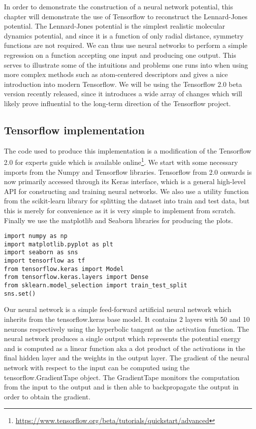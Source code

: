 In order to demonstrate the construction of a neural network
potential, this chapter will demonstrate the use of Tensorflow 
to reconstruct the Lennard-Jones potential.
The Lennard-Jones potential is the simplest
realistic molecular dynamics potential, and since it is a function
of only radial distance, symmetry functions are not required.
We can thus use neural networks to perform a simple regression
on a function accepting one input and producing one output.
This serves to illustrate some of the intuitions and problems
one runs into when using more complex methods such as 
atom-centered descriptors and gives a nice introduction into
modern Tensorflow. We will be using the Tensorflow 2.0
beta version recently released, since it introduces a wide array
of changes which will likely prove influential to the long-term
direction of the Tensorflow project.

\subsection{Tensorflow implementation}
The code used to produce this implementation is
a modification of the Tensorflow 2.0 for experts guide
which is available online\footnote{\url{
https://www.tensorflow.org/beta/tutorials/quickstart/advanced}}.
We start with some necessary imports from the Numpy and Tensorflow
libraries. Tensorflow from 2.0 onwards is now primarily accessed through
its Keras interface, which is a general high-level API for
constructing and training neural networks.
We also use a utility function from the scikit-learn library
for splitting the dataset into train and test data, but this is
merely for convenience as it is very simple to implement from scratch.
Finally we use the matplotlib and Seaborn libraries for
producing the plots.

\begin{verbatim}
import numpy as np
import matplotlib.pyplot as plt
import seaborn as sns
import tensorflow as tf
from tensorflow.keras import Model
from tensorflow.keras.layers import Dense
from sklearn.model_selection import train_test_split
sns.set()
\end{verbatim}

Our neural network is a simple feed-forward artificial neural network
which inherits from the tensorflow.keras base model.
It contains 2 layers with 50 and 10 neurons respectively
using the hyperbolic tangent as the activation function.
The neural network produces a single output which represents
the potential energy and is computed as a linear function
aka a dot product of the activations in the final hidden layer
and the weights in the output layer.
The gradient of the neural network with respect to the input
can be computed using the tensorflow.GradientTape object.
The GradientTape monitors the computation from the input to the output
and is then able to backpropagate the output in order to obtain
the gradient.

